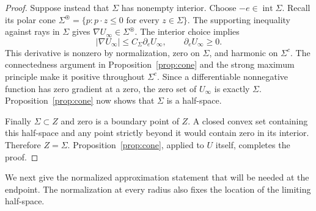 \documentclass[11pt]{article}
\numberwithin{equation}{section}
\theoremstyle{remark}
\newcommand{\abs}[1]{\lvert #1\rvert}
\begin{document}
\begin{proof}
Suppose instead that $\Sigma$ has nonempty interior. Choose $-e\in\operatorname{int}\Sigma$. Recall its polar cone $\Sigma^\circledast=\{p:p\cdot z\le0\text{ for every }z\in\Sigma\}$. The supporting inequality against rays in $\Sigma$ gives $\nabla U_\infty\in\Sigma^\circledast$. The interior choice implies
\[
 \abs{\nabla U_\infty}\le C_\Sigma\partial_eU_\infty,
 \qquad \partial_eU_\infty\ge0.
\]
This derivative is nonzero by normalization, zero on $\Sigma$, and harmonic on $\Sigma^c$. The connectedness argument in Proposition~\ref{prop:cone} and the strong maximum principle make it positive throughout $\Sigma^c$. Since a differentiable nonnegative function has zero gradient at a zero, the zero set of $U_\infty$ is exactly $\Sigma$. Proposition~\ref{prop:cone} now shows that $\Sigma$ is a half-space.

Finally $\Sigma\subset Z$ and zero is a boundary point of $Z$. A closed convex set containing this half-space and any point strictly beyond it would contain zero in its interior. Therefore $Z=\Sigma$. Proposition~\ref{prop:cone}, applied to $U$ itself, completes the proof.
\end{proof}

We next give the normalized approximation statement that will be needed at the endpoint. The normalization at every radius also fixes the location of the limiting half-space.
\end{document}
